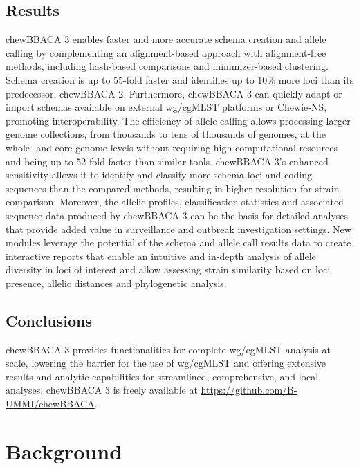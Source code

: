 \subsection{Results} \label{ssec:ch2_abstract_results}

chewBBACA 3 enables faster and more accurate schema creation and allele calling by complementing an alignment-based approach with alignment-free methods, including hash-based comparisons and minimizer-based clustering. Schema creation is up to 55-fold faster and identifies up to 10\% more loci than its predecessor, chewBBACA 2. Furthermore, chewBBACA 3 can quickly adapt or import schemas available on external \ac{wg/cgMLST} platforms or Chewie-NS, promoting interoperability. The efficiency of allele calling allows processing larger genome collections, from thousands to tens of thousands of genomes, at the whole- and core-genome levels without requiring high computational resources and being up to 52-fold faster than similar tools. chewBBACA 3’s enhanced sensitivity allows it to identify and classify more schema loci and coding sequences than the compared methods, resulting in higher resolution for strain comparison. Moreover, the allelic profiles, classification statistics and associated sequence data produced by chewBBACA 3 can be the basis for detailed analyses that provide added value in surveillance and outbreak investigation settings. New modules leverage the potential of the schema and allele call results data to create interactive reports that enable an intuitive and in-depth analysis of allele diversity in loci of interest and allow assessing strain similarity based on loci presence, allelic distances and phylogenetic analysis.

\subsection{Conclusions} \label{ssec:ch2_abstract_conclusions}

chewBBACA 3 provides functionalities for complete \ac{wg/cgMLST} analysis at scale, lowering the barrier for the use of \ac{wg/cgMLST} and offering extensive results and analytic capabilities for streamlined, comprehensive, and local analyses. chewBBACA 3 is freely available at \url{https://github.com/B-UMMI/chewBBACA}.

\section{Background} \label{sec:ch2_background}

